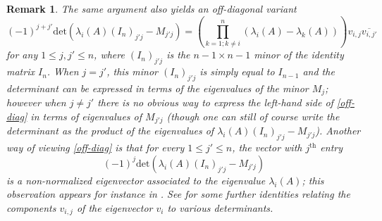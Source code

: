 \documentclass[12pt]{amsart}
\newtheorem{remark}[lemma]{Remark}
\begin{document}
\begin{remark}
The same argument also yields an off-diagonal variant
\begin{equation}\label{off-diag}
 (-1)^{j+j'} \mathrm{det}(\lambda_i(A) (I_n)_{j'j} - M_{j'j}) = (\prod_{k=1; k \neq i}^n (\lambda_i(A) - \lambda_k(A)) ) v_{i,j} \overline{v_{i,j'}}
\end{equation}
for any $1 \leq j,j' \leq n$, where $(I_n)_{j'j}$ is the $n-1 \times n-1$ minor of the identity matrix $I_n$.  When $j=j'$, this minor $(I_n)_{j'j}$ is simply equal to $I_{n-1}$ and the determinant can be expressed in terms of the eigenvalues of the minor $M_j$; however when $j \neq j'$ there is no obvious way to express the left-hand side of \eqref{off-diag} in terms of eigenvalues of $M_{j'j}$ (though one can still of course write the determinant as the product of the eigenvalues of $\lambda_i(A) (I_n)_{j'j} - M_{j'j}$).  Another way of viewing \eqref{off-diag} is that for every $1 \leq j' \leq n$, the vector with $j^{\mathrm{th}}$ entry
$$ (-1)^{j} \mathrm{det}(\lambda_i(A) (I_n)_{j'j} - M_{j'j}) $$
is a non-normalized eigenvector associated to the eigenvalue $\lambda_i(A)$; this observation appears for instance in \cite[p. 85--86]{gantmacher}.  See \cite{2014arXiv1401.4580V} for some further identities relating the components $v_{i,j}$ of the eigenvector $v_i$ to various determinants.
\end{remark}
\end{document}
